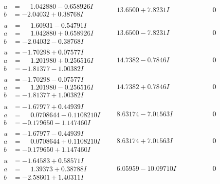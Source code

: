 \documentclass[1p]{elsarticle_modified}
\theoremstyle{definition}
\begin{document}
$$\begin{array}{c|c|c}
\begin{aligned}
a &= \phantom{-}1.042880 - 0.658926 I \\
b &= -2.04032 + 0.38768 I\end{aligned}
 & \phantom{-}13.6500 + 7.8231 I & \phantom{-0.000000 } 0 \\ \hline\begin{aligned}
u &= \phantom{-}1.60931 - 0.54791 I \\
a &= \phantom{-}1.042880 + 0.658926 I \\
b &= -2.04032 - 0.38768 I\end{aligned}
 & \phantom{-}13.6500 - 7.8231 I & \phantom{-0.000000 } 0 \\ \hline\begin{aligned}
u &= -1.70298 + 0.07577 I \\
a &= \phantom{-}1.201980 + 0.256516 I \\
b &= -1.81377 - 1.00382 I\end{aligned}
 & \phantom{-}14.7382 - 0.7846 I & \phantom{-0.000000 } 0 \\ \hline\begin{aligned}
u &= -1.70298 - 0.07577 I \\
a &= \phantom{-}1.201980 - 0.256516 I \\
b &= -1.81377 + 1.00382 I\end{aligned}
 & \phantom{-}14.7382 + 0.7846 I & \phantom{-0.000000 } 0 \\ \hline\begin{aligned}
u &= -1.67977 + 0.44939 I \\
a &= \phantom{-}0.0708644 - 0.1108210 I \\
b &= -0.179650 - 1.147460 I\end{aligned}
 & \phantom{-}8.63174 - 7.01563 I & \phantom{-0.000000 } 0 \\ \hline\begin{aligned}
u &= -1.67977 - 0.44939 I \\
a &= \phantom{-}0.0708644 + 0.1108210 I \\
b &= -0.179650 + 1.147460 I\end{aligned}
 & \phantom{-}8.63174 + 7.01563 I & \phantom{-0.000000 } 0 \\ \hline\begin{aligned}
u &= -1.64583 + 0.58571 I \\
a &= \phantom{-}1.39373 + 0.38788 I \\
b &= -2.58601 + 1.40311 I\end{aligned}
 & \phantom{-}6.05959 - 10.09710 I & \phantom{-0.000000 } 0 \\ \hline\begin{aligned}

\end{aligned}
\end{array}$$
\end{document}
